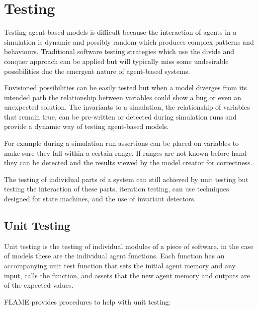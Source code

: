 \section{Testing}

Testing agent-based models is difficult because the interaction of agents in a
simulation is dynamic and possibly random which produces complex patterns and
behaviours. Traditional software testing strategies which use the divide and
conquer approach can be applied but will typically miss some undesirable
possibilities due the emergent nature of agent-based systems.

Envisioned possibilities can be easily tested but when a model diverges from
its intended path the relationship between variables could show a bug or even
an unexpected solution. The invariants to a simulation, the relationship of
variables that remain true, can be pre-written or detected during simulation
runs and provide a dynamic way of testing agent-based models.

For example during a simulation run assertions can be placed on variables to
make sure they fall within a certain range. If ranges are not known before hand
they can be detected and the results viewed by the model creator for
correctness.

The testing of individual parts of a system can still achieved by unit testing
but testing the interaction of these parts, iteration testing, can use
techniques designed for state machines, and the use of invariant detectors.

\subsection{Unit Testing}

Unit testing is the testing of individual modules of a piece of software, in the
case of models these are the individual agent functions. Each function has an
accompanying unit test function that sets the initial agent memory and any input,
calls the function, and assets that the new agent memory and outputs are of the
expected values.

FLAME provides procedures to help with unit testing:

